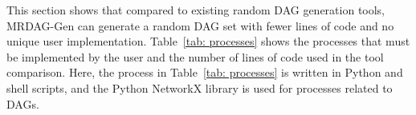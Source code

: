 This section shows that compared to existing random DAG generation tools, MRDAG-Gen can generate a random DAG set with fewer lines of code and no unique user implementation.
Table~\ref{tab: processes} shows the processes that must be implemented by the user and the number of lines of code used in the tool comparison.
Here, the process in Table~\ref{tab: processes} is written in Python and shell scripts, and the Python NetworkX library is used for processes related to DAGs.


\begin{table}[tb]
    \centering
    \caption{Effort required to generate random DAG sets \\ for {\it Case Study 1} \cite{subbaraj2020multi, liu2016minimizing, sheikh2016sixteen}}
    \label{tab: eval_case_study_single}
    \renewcommand{\arraystretch}{1.2}
\end{table}


